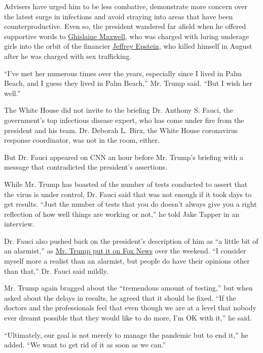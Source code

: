 Advisers have urged him to be less combative, demonstrate more concern
over the latest surge in infections and avoid straying into areas that
have been counterproductive. Even so, the president wandered far afield
when he offered supportive words to
\href{https://www.nytimes.com/2020/07/02/nyregion/ghislaine-maxwell-arrest-jeffrey-epstein.html}{Ghislaine
Maxwell}, who was charged with luring underage girls into the orbit of
the financier
\href{https://www.nytimes.com/2019/08/10/nyregion/jeffrey-epstein-suicide.html}{Jeffrey
Epstein}, who killed himself in August after he was charged with sex
trafficking.

``I've met her numerous times over the years, especially since I lived
in Palm Beach, and I guess they lived in Palm Beach,'' Mr. Trump said.
``But I wish her well.''

The White House did not invite to the briefing Dr. Anthony S. Fauci, the
government's top infectious disease expert, who has come under fire from
the president and his team. Dr. Deborah L. Birx, the White House
coronavirus response coordinator, was not in the room, either.

But Dr. Fauci appeared on CNN an hour before Mr. Trump's briefing with a
message that contradicted the president's assertions.

While Mr. Trump has boasted of the number of tests conducted to assert
that the virus is under control, Dr. Fauci said that was not enough if
it took days to get results. ``Just the number of tests that you do
doesn't always give you a right reflection of how well things are
working or not,'' he told Jake Tapper in an interview.

Dr. Fauci also pushed back on the president's description of him as ``a
little bit of an alarmist,'' as
\href{https://www.nytimes.com/2020/07/19/us/politics/trump-fox-interview-coronavirus-race.html}{Mr.
Trump put it on Fox News} over the weekend. ``I consider myself more a
realist than an alarmist, but people do have their opinions other than
that,'' Dr. Fauci said mildly.

Mr. Trump again bragged about the ``tremendous amount of testing,'' but
when asked about the delays in results, he agreed that it should be
fixed. ``If the doctors and the professionals feel that even though we
are at a level that nobody ever dreamt possible that they would like to
do more, I'm OK with it,'' he said.

``Ultimately, our goal is not merely to manage the pandemic but to end
it,'' he added. ``We want to get rid of it as soon as we can.''

